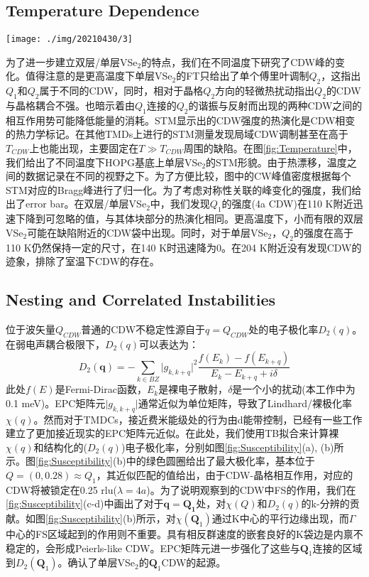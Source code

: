 \documentclass[reprint, aps, prb, showkeys]{revtex4-2}
\begin{document}
\subsection{Temperature Dependence}
\begin{figure*}[t]
    \texttt{[image: ./img/20210430/3]}
    \caption{\label{fig:Temperature} 
    超薄VSe$_2$中温度依赖的CDW关系。
    }
\end{figure*}
为了进一步建立双层/单层VSe$_2$的特点，我们在不同温度下研究了CDW峰的变化。值得注意的是更高温度下单层VSe$_2$的FT只给出了单个傅里叶调制$Q_2$，这指出$Q_1$和$Q_2$属于不同的CDW，同时，相对于晶格$Q_2$方向的轻微热扰动指出$Q_2$的CDW与晶格耦合不强。也暗示着由$Q_1$连接的$Q_2$的谐振与反射而出现的两种CDW之间的相互作用势可能降低能量的消耗。STM显示出的CDW强度的热演化是CDW相变的热力学标记。在其他TMDs上进行的STM测量发现局域CDW调制甚至在高于$T_{CDW}$上也能出现，主要固定在$T \gg T_{CDW}$周围的缺陷。在图\ref{fig:Temperature}中，我们给出了不同温度下HOPG基底上单层VSe$_2$的STM形貌。由于热漂移，温度之间的数据记录在不同的视野之下。为了方便比较，图中的CW峰值密度根据每个STM对应的Bragg峰进行了归一化。为了考虑对称性关联的峰变化的强度，我们给出了error bar。在双层/单层VSe$_2$中，我们发现$Q_1$的强度(4a CDW)在110 K附近迅速下降到可忽略的值，与其体块部分的热演化相同。更高温度下，小而有限的双层VSe$_2$可能在缺陷附近的CDW袋中出现。同时，对于单层VSe$_2$，$Q_2$的强度在高于110 K仍然保持一定的尺寸，在140 K时迅速降为0。在204 K附近没有发现CDW的迹象，排除了室温下CDW的存在。

\subsection{Nesting and Correlated Instabilities}
位于波矢量$Q_{CDW}$普通的CDW不稳定性源自于$q = Q_{CDW}$处的电子极化率$D_2(q)$。在弱电声耦合极限下，$D_2(q)$可以表达为：
\begin{equation}
    D_2(\boldsymbol{q}) = -\sum_{k \in BZ} \vert g_{k, k+q} \vert^2 \frac{f(E_k) - f(E_{k+q})}{E_k - E_{k+q} + i\delta}
\end{equation}
此处$f(E)$是Fermi-Dirac函数，$E_k$是裸电子散射，$\delta$是一个小的扰动(本工作中为0.1 meV)。EPC矩阵元$\vert g_{k,k+q} \vert$通常近似为单位矩阵，导致了Lindhard/裸极化率$\chi(q)$。然而对于TMDCs，接近费米能级处的行为由d能带控制，已经有一些工作建立了更加接近现实的EPC矩阵元近似。在此处，我们使用TB拟合来计算裸$\chi(q)$和结构化的($D_2(q)$)电子极化率，分别如图\ref{fig:Susceptibility}(a), (b)所示。图\ref{fig:Susceptibility}(b)中的绿色圆圈给出了最大极化率，基本位于$Q = (0, 0.28) \approx Q_1$，其近似匹配的值给出，由于CDW-晶格相互作用，对应的CDW将被锁定在0.25 rlu($\lambda = 4a$)。为了说明观察到的CDW中FS的作用，我们在\ref{fig:Susceptibility}(c-d)中画出了对于$\boldsymbol{q} = \boldsymbol{Q_1}$处，对$\chi(Q)$和$D_2(q)$的k-分辨的贡献。如图\ref{fig:Susceptibility}(b)所示，对$\chi(\boldsymbol{Q}_1)$通过K中心的平行边缘出现，而$\Gamma$中心的FS区域起到的作用则不重要。具有相反群速度的嵌套良好的K袋边是内禀不稳定的，会形成Peierls-like CDW。EPC矩阵元进一步强化了这些与$\boldsymbol{Q}_1$连接的区域到$D_2(\boldsymbol{Q}_1)$。确认了单层VSe$_2$的$\boldsymbol{Q}_1$CDW的起源。
\end{document}
